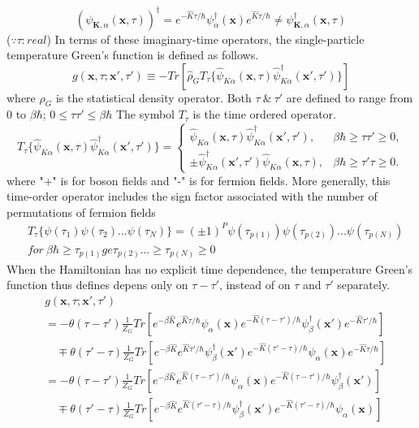 $$(\psi_{\mathbf{K},\alpha}(\mathbf{x},\tau))^{\dagger}=e^{-\hat{K}\tau/\hbar}\psi_{\alpha}^{\dagger}(\mathbf{x})e^{\hat{K}\tau/\hbar}
\not=\psi^{\dagger}_{\mathbf{K},\alpha}(\mathbf{x},\tau)$$
($\because \tau : real$)
In terms of these imaginary-time operators, the single-particle temperature Green's function is defined as follows.
\begin{equation}
g(\mathbf{x},\tau;\mathbf{x'},\tau')\equiv-Tr[\hat{\rho}_{G}T_{\tau}\{\hat{\psi}_{K\alpha}(\mathbf{x},\tau)\hat{\psi}_{K\alpha}^{\dagger}(\mathbf{x'},\tau')\}]
\end{equation}
where $\rho_{G}$ is the statistical density operator.
Both $\tau\ \&\ \tau'$ are defined to range from $0$ to $\beta\hbar$; $0\leq\tau\tau'\leq\beta\hbar$
The symbol $T_{\tau}$ is the time ordered operator.
$$
{T_{\tau}\{\hat{\psi}_{K\alpha}(\mathbf{x},\tau)\hat{\psi}_{K\alpha}^{\dagger}(\mathbf{x'},\tau')\}=}
\begin{cases}
\hat{\psi}_{K\alpha}(\mathbf{x},\tau)\hat{\psi}_{K\alpha}^{\dagger}(\mathbf{x'},\tau') , &\beta\hbar\geq\tau\tau'\geq 0, \\
\pm\hat{\psi}_{K\alpha}^{\dagger}(\mathbf{x'},\tau')\hat{\psi}_{K\alpha}(\mathbf{x},\tau) , &\beta\hbar\geq\tau'\tau\geq 0.
\end{cases}
$$
where "+" is for boson fields and "-" is for fermion fields.
More generally, this time-order operator includes the sign factor associated with the number of permutations of fermion fields
$$
\begin{aligned}
&T_{\tau}\{\psi(\tau_{1})\psi(\tau_{2})...\psi(\tau_{N})\}=(\pm1)^{P}\psi(\tau_{p(1)})\psi(\tau_{p(2)})...\psi(\tau_{p(N)})\\
&for\ \beta\hbar\ge\tau_{p(1)}ge\tau_{p(2)}...\ge\tau_{p(N)}\ge0
\end{aligned}
$$
When the Hamiltonian has no explicit time dependence, the temperature Green's function thus defines depens only on $\tau-\tau'$, instead of on $\tau$ and $\tau'$ separately.
\begin{equation}
\begin{aligned}
&g(\mathbf{x},\tau;\mathbf{x'},\tau')\\
&=-\theta(\tau-\tau')\frac{1}{Z_{G}}Tr[e^{-\beta\hat{K}}e^{\hat{K}\tau/\hbar}\psi_{\alpha}(\mathbf{x})
e^{-\hat{K}(\tau-\tau')/\hbar}\psi_{\beta}^{\dagger}(\mathbf{x'})e^{-\hat{K}\tau'/\hbar}]\\
&\quad\mp\theta(\tau'-\tau)\frac{1}{Z_{G}}Tr[e^{-\beta\hat{K}}e^{\hat{K}\tau'/\hbar}\psi_{\beta}^{\dagger}(\mathbf{x'})
e^{-\hat{K}(\tau'-\tau)/\hbar}\psi_{\alpha}(\mathbf{x})e^{-\hat{K}\tau/\hbar}]\\
&=-\theta(\tau-\tau') \frac{1}{Z_{G}} Tr[e^{-\beta\hat{K}} e^{\hat{K}(\tau-\tau')/\hbar}\psi_{\alpha}(\mathbf{x})
e^{-\hat{K}(\tau-\tau')/\hbar}\psi_{\beta}^{\dagger}(\mathbf{x'})]\\
&\quad\mp\theta(\tau'-\tau)\frac{1}{Z_{G}}Tr[e^{-\beta\hat{K}}e^{\hat{K}(\tau'-\tau)/\hbar}\psi_{\beta}^{\dagger}(\mathbf{x'})
e^{-\hat{K}(\tau'-\tau)/\hbar}\psi_{\alpha}(\mathbf{x})]
\end{aligned}
\end{equation}
